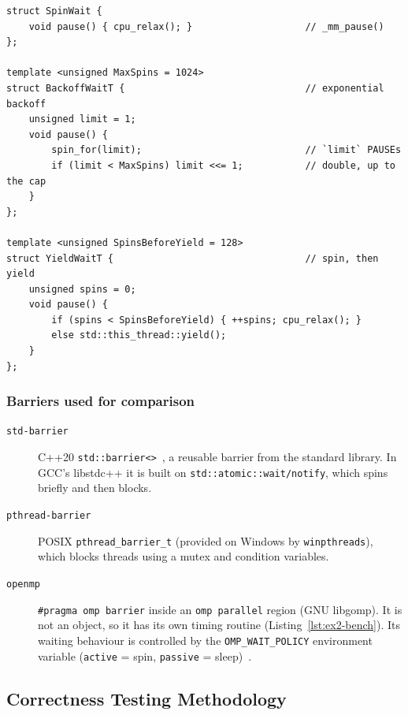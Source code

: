 \begin{lstlisting}[caption={Waiting policies (\texttt{barriers.hpp}).},label={lst:ex2-wait}]
struct SpinWait {
    void pause() { cpu_relax(); }                    // _mm_pause()
};

template <unsigned MaxSpins = 1024>
struct BackoffWaitT {                                // exponential backoff
    unsigned limit = 1;
    void pause() {
        spin_for(limit);                             // `limit` PAUSEs
        if (limit < MaxSpins) limit <<= 1;           // double, up to the cap
    }
};

template <unsigned SpinsBeforeYield = 128>
struct YieldWaitT {                                  // spin, then yield
    unsigned spins = 0;
    void pause() {
        if (spins < SpinsBeforeYield) { ++spins; cpu_relax(); }
        else std::this_thread::yield();
    }
};
\end{lstlisting}

\subsubsection{Barriers used for comparison}

\begin{description}
    \item[\texttt{std-barrier}] C++20 \texttt{std::barrier<>}~\cite{cppbarrier},
          a reusable barrier from the standard library. In GCC's libstdc++
          it is built on \texttt{std::atomic::wait/notify}, which spins
          briefly and then blocks.
    \item[\texttt{pthread-barrier}] POSIX \texttt{pthread\_barrier\_t}
          (provided on Windows by \texttt{winpthreads}), which blocks
          threads using a mutex and condition variables.
    \item[\texttt{openmp}] \texttt{\#pragma omp barrier} inside an
          \texttt{omp parallel} region (GNU libgomp). It is not an object,
          so it has its own timing routine (Listing~\ref{lst:ex2-bench}).
          Its waiting behaviour is controlled by the
          \texttt{OMP\_WAIT\_POLICY} environment variable
          (\texttt{active} = spin, \texttt{passive} = sleep)~\cite{openmp52}.
\end{description}

\subsection{Correctness Testing Methodology}
\label{sec:ex2-testing}

